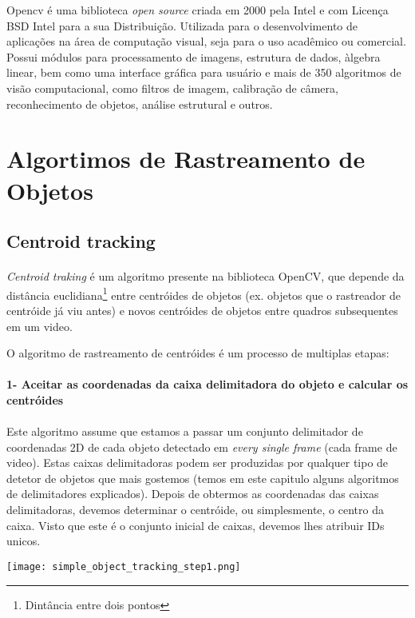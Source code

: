 Opencv é uma biblioteca \textit{open source} criada em 2000 pela Intel e com Licença BSD Intel para a sua Distribuição. Utilizada para o desenvolvimento de aplicações na área de computação visual, seja para o uso acadêmico ou comercial. Possui módulos para processamento de imagens, estrutura de dados, àlgebra linear, bem como uma interface gráfica para usuário e mais de 350 algoritmos de visão computacional, como filtros de imagem, calibração de câmera, reconhecimento de objetos, análise estrutural e outros.


\section{Algortimos de Rastreamento de Objetos}
\label{chap2:subsec:algoritmosrastreamento}



\subsection{Centroid tracking}
\label{chap2:subsec:centroidtraking}



\paragraph{}
\textit{Centroid traking} é um algoritmo presente na biblioteca OpenCV, que depende da distância euclidiana\footnote{Dintância entre dois pontos} entre centróides de objetos (ex. objetos que o rastreador de centróide já viu antes) e novos centróides de objetos entre quadros subsequentes em um video.

O algoritmo de rastreamento de centróides é um processo de multiplas etapas:

\paragraph{1- Aceitar as coordenadas da caixa delimitadora do objeto e calcular os centróides}
\paragraph{}
Este algoritmo assume que estamos a passar um conjunto delimitador de coordenadas 2D de cada objeto detectado em \textit{every single frame} (cada frame de video).
\newline
Estas caixas delimitadoras podem ser produzidas por qualquer tipo de detetor de objetos que mais gostemos (temos em este capitulo alguns algoritmos de delimitadores explicados).
\newline
Depois de obtermos as coordenadas das caixas delimitadoras, devemos determinar o centróide, ou simplesmente, o centro da caixa.
\newline
Visto que este é o conjunto inicial de caixas, devemos lhes atribuir IDs unicos.
\begin{center}
  \texttt{[image: simple\_object\_tracking\_step1.png]}
  \label{img:centroid_traking1}  
\end{center}

